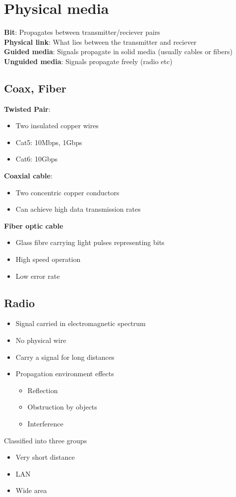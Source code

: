\documentclass{article}[18pt]
\begin{document}
\section{Physical media}
\textbf{Bit}:  Propagates between transmitter/reciever pairs\\
\textbf{Physical link}: What lies between the transmitter and reciever\\
\textbf{Guided media}: Signals propagate in solid media (usually cables or fibers)\\
\textbf{Unguided media}: Signals propagate freely (radio etc)
\subsection{Coax, Fiber}
\textbf{Twisted Pair}:
\begin{itemize}
	\item Two insulated copper wires
	\item Cat5: 10Mbps, 1Gbps
	\item Cat6: 10Gbps
\end{itemize}
\textbf{Coaxial cable}:
\begin{itemize}
	\item Two concentric copper conductors
	\item Can achieve high data transmission rates
\end{itemize}
\textbf{Fiber optic cable}
\begin{itemize}
	\item Glass fibre carrying light pulses representing bits
	\item High speed operation
	\item Low error rate
\end{itemize}
\subsection{Radio}
\begin{itemize}
	\item Signal carried in electromagnetic spectrum
	\item No physical wire
	\item Carry a signal for long distances
	\item Propagation environment effects
	\begin{itemize}
		\item Reflection
		\item Obstruction by objects
		\item Interference
	\end{itemize}
\end{itemize}
Classified into three groups
\begin{itemize}
	\item Very short distance
	\item LAN
	\item Wide area
\end{itemize}
\end{document}
